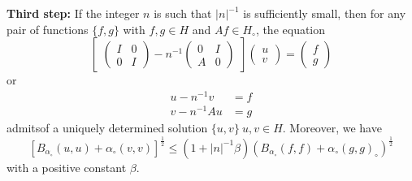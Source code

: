  \medskip
 \noindent
{\bf Third step:} If the integer $n$ is such that $| n |^{-1}$ is
sufficiently small, then for any pair of functions $\{f,g\}$ with $f,
g \in H$ and $A f \in H_\circ$, the equation 
 \begin{equation*}
  \begin{bmatrix}
   \begin{pmatrix}I & 0 \\ 0 & I\end{pmatrix}
    -n^{-1}
    \begin{pmatrix}0 & I \\ A & 0\end{pmatrix}
  \end{bmatrix}
  \begin{pmatrix}u \\ v\end{pmatrix}
   =
   \begin{pmatrix}f \\ g \end{pmatrix}
   \tag {2}
 \end{equation*} 
 or
 \begin{align*}
  u  - n^{-1} v & = f \\
  v  - n^{-1} A u & =g
 \end{align*}
 admits\pageoriginale of a uniquely determined solution $\{u,v\}~ u, v \in
 H$. Moreover, we have 
 $$
 \left[ B_{\alpha_\circ}(u, u) + \alpha_\circ (v, v) \right
 ]^{\frac{1}{2}} \leq (1+ | n|^{-1} \beta) (B_{\alpha_\circ}(f,f) +
 \alpha_\circ (g,g)_\circ )^{\frac{1}{2}} 
 $$
 with a positive constant $\beta$.


